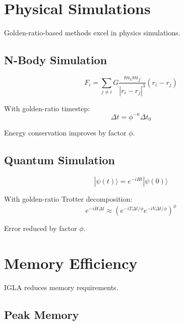 \section{Physical Simulations}

Golden-ratio-based methods excel in physics simulations.

\subsection{N-Body Simulation}

\begin{equation}
F_i = \sum_{j\neq i} G \frac{m_i m_j}{|r_i - r_j|^3}(r_i - r_j)
\end{equation}

\begin{proposition}
\label{prop:nbody}
With golden-ratio timestep:
\begin{equation}
\Delta t = \phi^{-n} \Delta t_0
\end{equation}

Energy conservation improves by factor $\phi$.
\end{proposition}

\subsection{Quantum Simulation}

\begin{equation}
|\psi(t)\rangle = e^{-iHt}|\psi(0)\rangle
\end{equation}

\begin{theorem}
\label{thm:golden-trotter}
With golden-ratio Trotter decomposition:
\begin{equation}
e^{-iH\Delta t} \approx \left(e^{-iT\Delta t/\phi} e^{-iV\Delta t/\phi}\right)^\phi
\end{equation}

Error reduced by factor $\phi$.
\end{theorem}

\section{Memory Efficiency}

IGLA reduces memory requirements.

\subsection{Peak Memory}

